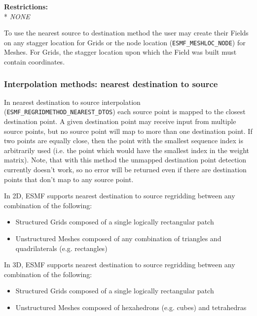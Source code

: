 \smallskip

\textbf{Restrictions:}\\*
\textit{NONE}

\smallskip

 To use the nearest source to destination method the user may create their Fields on any stagger location for Grids or the node location ({\tt ESMF\_MESHLOC\_NODE}) for Meshes.
 For Grids, the stagger location upon which the Field was built must contain coordinates. 


\subsubsection{Interpolation methods: nearest destination to source}\label{sec:interpolation:nearestdtos}
In nearest destination to source interpolation ({\tt ESMF\_REGRIDMETHOD\_NEAREST\_DTOS}) each source point is mapped to the closest destination point. A given destination point may receive input from multiple source points, but no source point will map to more than one destination point. If two points are equally close, then the point with the smallest sequence index is arbitrarily used (i.e. the point which would have the smallest index in the weight matrix). Note, that with this method the unmapped destination point detection currently doesn't work, so no error will be returned even if there are destination points that don't map to any source point. 

\smallskip

 In 2D, ESMF supports nearest destination to source regridding between any combination of the following:
 \begin{itemize}
 \item Structured Grids composed of a single logically rectangular patch
 \item Unstructured Meshes composed of any combination of triangles and quadrilaterals (e.g. rectangles)
 \end{itemize}

\smallskip

 In 3D, ESMF supports nearest destination to source regridding between any combination of the following:
 \begin{itemize}
 \item Structured Grids composed of a single logically rectangular patch
 \item Unstructured Meshes composed of hexahedrons (e.g. cubes) and tetrahedras
 \end{itemize}


